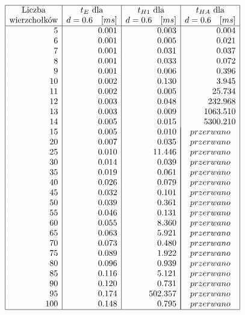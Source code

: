 \documentclass[polish,polish,a4paper]{article}
\begin{document}
\begin{spacing}{1.25}
\begin{spacing}{1.3}
	\begin{equation*}
	\begin{array}{|r|r|r|r|}
	\hline
	\multicolumn{1}{|c|}{$Liczba$}&
	\multicolumn{1}{c|}{t_{E}$ dla$ }&
	\multicolumn{1}{c|}{t_{H1} $ dla$}&
	\multicolumn{1}{c|}{t_{HA}$ dla$}\\
	\multicolumn{1}{|c|}{$wierzchołków$}&
	\multicolumn{1}{c|}{d = 0.6 \quad [ms]}&
	\multicolumn{1}{c|}{d = 0.6 \quad [ms]}&
	\multicolumn{1}{c|}{d = 0.6 \quad [ms]}\\
	\hline
5&0.001&0.003&0.004\\
6&0.001&0.005&0.021\\
7&0.001&0.031&0.037\\
8&0.001&0.033&0.072\\
9&0.001&0.006&0.396\\
10&0.002&0.130&3.945\\
11&0.002&0.005&25.734\\
12&0.003&0.048&232.968\\
13&0.003&0.009&1063.510\\
14&0.005&0.015&5300.210\\
15&0.005&0.010&\multicolumn{1}{|c|}{przerwano}\\
20&0.007&0.035&\multicolumn{1}{|c|}{przerwano}\\
25&0.010&11.446&\multicolumn{1}{|c|}{przerwano}\\
30&0.014&0.039&\multicolumn{1}{|c|}{przerwano}\\
35&0.019&0.061&\multicolumn{1}{|c|}{przerwano}\\
40&0.026&0.079&\multicolumn{1}{|c|}{przerwano}\\
45&0.032&0.101&\multicolumn{1}{|c|}{przerwano}\\
50&0.039&0.361&\multicolumn{1}{|c|}{przerwano}\\
55&0.046&0.131&\multicolumn{1}{|c|}{przerwano}\\
60&0.055&8.360&\multicolumn{1}{|c|}{przerwano}\\
65&0.063&5.921&\multicolumn{1}{|c|}{przerwano}\\
70&0.073&0.480&\multicolumn{1}{|c|}{przerwano}\\
75&0.089&1.922&\multicolumn{1}{|c|}{przerwano}\\
80&0.096&0.939&\multicolumn{1}{|c|}{przerwano}\\
85&0.116&5.121&\multicolumn{1}{|c|}{przerwano}\\
90&0.120&0.731&\multicolumn{1}{|c|}{przerwano}\\
95&0.174&502.357&\multicolumn{1}{|c|}{przerwano}\\
100&0.148&0.795&\multicolumn{1}{|c|}{przerwano}\\
\hline
	\end{array}
	\end{equation*}
\end{spacing}



\end{spacing}
\end{document}
